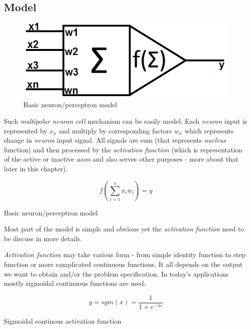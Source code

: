 \newpage
\subsection{Model}

\begin{figure}[!h]
    \centering
    \includegraphics[scale=0.5]{Media/Neuron.png}
    \caption{Basic neuron/perceptron model}
    \label{fig:NeuronModel}
\end{figure}

Such \textit{multipolar neuron cell} mechanism can be easily model. Each \textit{neuron} input is represented by $x_n$ and multiply by corresponding factors $w_n$ which represents change in \textit{neuron} input signal. All signals are sum (that represents \textit{nucleus} function) and then processed by the \textit{activation function} (which is representation of the active or inactive \textit{axon} and also serves other purposes - more about that later in this chapter).

\begin{mycapequ}[!ht]
    $$f\left(\sum\limits_{i=1}^n x_iw_i\right) = y$$
    \caption{Basic neuron/perceptron model}
    \label{formula:NeuronMathModelEquation}
\end{mycapequ}

Most part of the model is simple and obvious yet the \textit{activation function} need to be discuss in more details.

\textit{Activation function} may take various form - from simple identity function to step function or more complicated continuous functions. It all depends on the output we want to obtain and/or the problem specification. In today's applications mostly sigmoidal continuous functions are used:

\begin{mycapequ}[!ht]
    $$y = sgm(x) = \frac{1}{1+e^{-\lambda s}}$$
    \caption{Sigmoidal continous activation function}
    \label{formula:SigmoidalActivationFunction}
\end{mycapequ}


